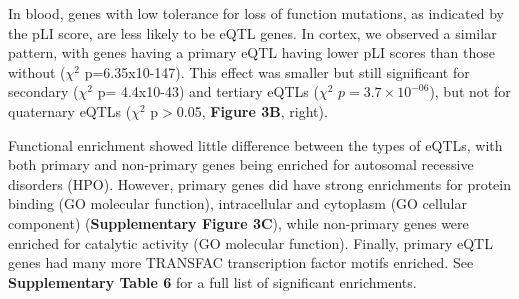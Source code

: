 In blood, genes with low tolerance for loss of function mutations, as indicated by the pLI score, are less likely to be eQTL genes\cite{vosaUnravelingPolygenicArchitecture2018}. In cortex, we observed a similar pattern, with genes having a primary eQTL having lower pLI scores than those without ($\chi^2$ p=6.35x10-147). This effect was smaller but still significant for secondary ($\chi^2$ p= 4.4x10-43) and tertiary eQTLs ($\chi^2$ $p = 3.7 \times 10^{-06}$), but not for quaternary eQTLs ($\chi^2$ p$>$0.05, \textbf{Figure 3B}, right). 

Functional enrichment showed little difference between the types of eQTLs, with both primary and non-primary genes being enriched for autosomal recessive disorders (HPO). However, primary genes did have strong enrichments for protein binding (GO molecular function), intracellular and cytoplasm (GO cellular component) (\textbf{Supplementary Figure 3C}), while non-primary genes were enriched for catalytic activity (GO molecular function). Finally, primary eQTL genes had many more TRANSFAC\cite{wingenderTRANSFACDatabaseTranscription1996} transcription factor motifs enriched. See \textbf{Supplementary Table 6} for a full list of significant enrichments.    

